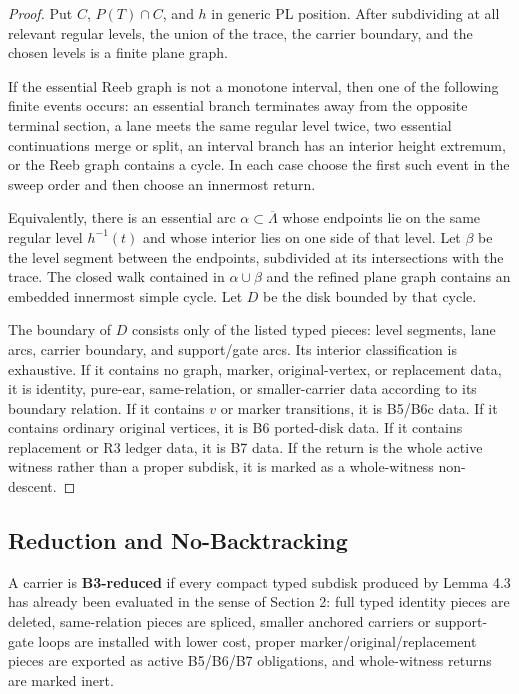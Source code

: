 \documentclass[11pt]{amsart}
\theoremstyle{definition}
\begin{document}
\begin{proof}
Put \(C\), \(P(T)\cap C\), and \(h\) in generic PL position. After subdividing at all relevant regular levels, the union of the trace, the carrier boundary, and the chosen levels is a finite plane graph.

If the essential Reeb graph is not a monotone interval, then one of the following finite events occurs: an essential branch terminates away from the opposite terminal section, a lane meets the same regular level twice, two essential continuations merge or split, an interval branch has an interior height extremum, or the Reeb graph contains a cycle. In each case choose the first such event in the sweep order and then choose an innermost return.

Equivalently, there is an essential arc \(\alpha\subset\overline\Lambda\) whose endpoints lie on the same regular level \(h^{-1}(t)\) and whose interior lies on one side of that level. Let \(\beta\) be the level segment between the endpoints, subdivided at its intersections with the trace. The closed walk contained in \(\alpha\cup\beta\) and the refined plane graph contains an embedded innermost simple cycle. Let \(D\) be the disk bounded by that cycle.

The boundary of \(D\) consists only of the listed typed pieces: level segments, lane arcs, carrier boundary, and support/gate arcs. Its interior classification is exhaustive. If it contains no graph, marker, original-vertex, or replacement data, it is identity, pure-ear, same-relation, or smaller-carrier data according to its boundary relation. If it contains \(v\) or marker transitions, it is B5/B6c data. If it contains ordinary original vertices, it is B6 ported-disk data. If it contains replacement or R3 ledger data, it is B7 data. If the return is the whole active witness rather than a proper subdisk, it is marked as a whole-witness non-descent.

\end{proof}
\subsection{Reduction and No-Backtracking}

A carrier is \textbf{B3-reduced} if every compact typed subdisk produced by Lemma 4.3 has already been evaluated in the sense of Section 2: full typed identity pieces are deleted, same-relation pieces are spliced, smaller anchored carriers or support-gate loops are installed with lower cost, proper marker/original/replacement pieces are exported as active B5/B6/B7 obligations, and whole-witness returns are marked inert.
\end{document}
